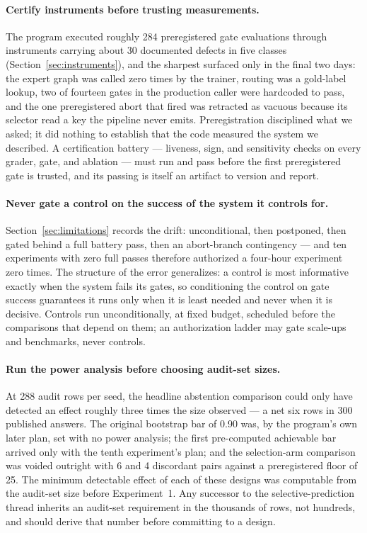 \documentclass[10pt,a4paper]{article}
\begin{document}
\paragraph{Certify instruments before trusting measurements.}
The program executed roughly 284 preregistered gate evaluations through instruments carrying about 30 documented defects in five classes (Section~\ref{sec:instruments}), and the sharpest surfaced only in the final two days: the expert graph was called zero times by the trainer, routing was a gold-label lookup, two of fourteen gates in the production caller were hardcoded to pass, and the one preregistered abort that fired was retracted as vacuous because its selector read a key the pipeline never emits. Preregistration disciplined what we asked; it did nothing to establish that the code measured the system we described. A certification battery --- liveness, sign, and sensitivity checks on every grader, gate, and ablation --- must run and pass before the first preregistered gate is trusted, and its passing is itself an artifact to version and report.

\paragraph{Never gate a control on the success of the system it controls for.}
Section~\ref{sec:limitations} records the drift: unconditional, then postponed, then gated behind a full battery pass, then an abort-branch contingency --- and ten experiments with zero full passes therefore authorized a four-hour experiment zero times. The structure of the error generalizes: a control is most informative exactly when the system fails its gates, so conditioning the control on gate success guarantees it runs only when it is least needed and never when it is decisive. Controls run unconditionally, at fixed budget, scheduled before the comparisons that depend on them; an authorization ladder may gate scale-ups and benchmarks, never controls.

\paragraph{Run the power analysis before choosing audit-set sizes.}
At 288 audit rows per seed, the headline abstention comparison could only have detected an effect roughly three times the size observed --- a net six rows in 300 published answers. The original bootstrap bar of 0.90 was, by the program's own later plan, set with no power analysis; the first pre-computed achievable bar arrived only with the tenth experiment's plan; and the selection-arm comparison was voided outright with 6 and 4 discordant pairs against a preregistered floor of 25. The minimum detectable effect of each of these designs was computable from the audit-set size before Experiment~1. Any successor to the selective-prediction thread inherits an audit-set requirement in the thousands of rows, not hundreds, and should derive that number before committing to a design.
\end{document}
